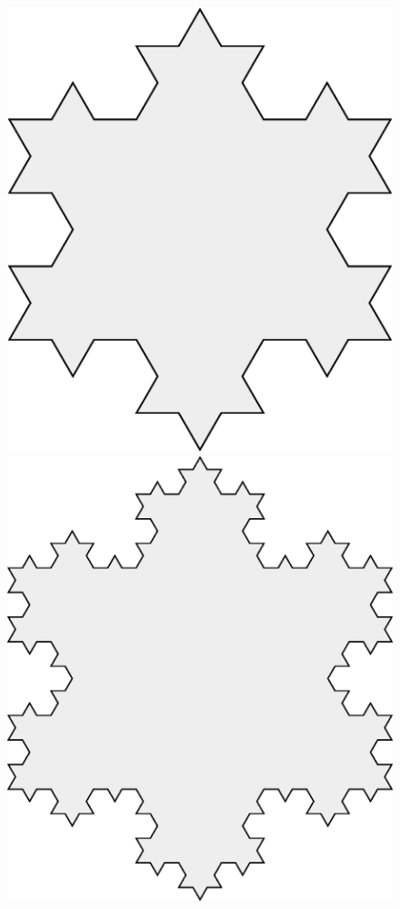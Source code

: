\begin{figure}[h!]
\begin{minipage}{.24\textwidth}
\end{minipage}
\hfill
\begin{minipage}{.24\textwidth}
\centering
\includegraphics[scale=.15]{pics/Koch_Snowflake-2}
\end{minipage}
\hfill
\begin{minipage}{.24\textwidth}
\centering
\includegraphics[scale=.15]{pics/Koch_Snowflake-3}
\end{minipage}
\end{figure}
